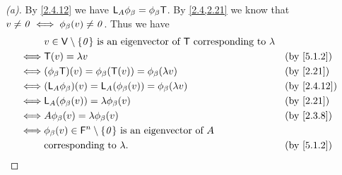 \begin{proof}[(a)]
  By \cref{2.4.12} we have \(\mathsf{L}_A \phi_{\beta} = \phi_{\beta} \mathsf{T}\).
  By \cref{2.4,2.21} we know that \(v \neq \mathit{0} \iff \phi_{\beta}(v) \neq \mathit{0}\).
  Thus we have
  \begin{align*}
         & v \in \V \setminus \set{\zv} \text{ is an eigenvector of } \T \text{ corresponding to } \lambda                                \\
    \iff & \T(v) = \lambda v                                                                               &  & \text{(by \cref{5.1.2})}  \\
    \iff & (\phi_{\beta} \T)(v) = \phi_{\beta}(\T(v)) = \phi_{\beta}(\lambda v)                            &  & \text{(by \cref{2.21})}   \\
    \iff & (\L_A \phi_{\beta})(v) = \L_A(\phi_{\beta}(v)) = \phi_{\beta}(\lambda v)                        &  & \text{(by \cref{2.4.12})} \\
    \iff & \L_A(\phi_{\beta}(v)) = \lambda \phi_{\beta}(v)                                                 &  & \text{(by \cref{2.21})}   \\
    \iff & A \phi_{\beta}(v) = \lambda \phi_{\beta}(v)                                                     &  & \text{(by \cref{2.3.8})}  \\
    \iff & \phi_{\beta}(v) \in \vs{F}^n \setminus \set{\zv} \text{ is an eigenvector of } A                                               \\
         & \text{corresponding to } \lambda.                                                               &  & \text{(by \cref{5.1.2})}
  \end{align*}
\end{proof}

